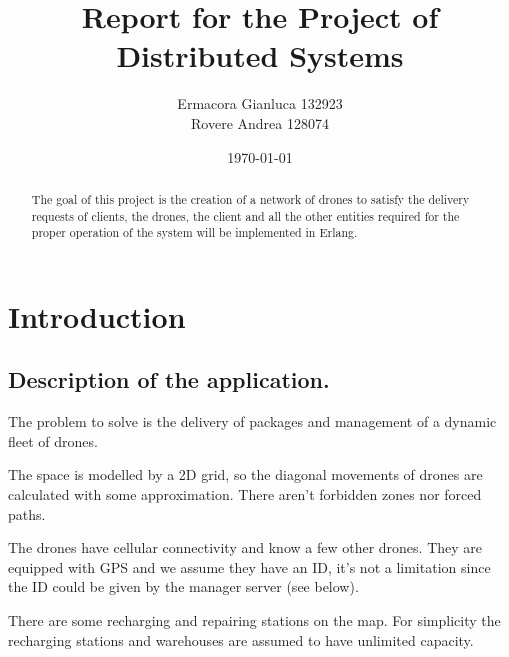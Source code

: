 \documentclass[a4paper, oneside]{memoir}
\title{Report for the Project of Distributed Systems}
\author{Ermacora Gianluca 132923\\ Rovere Andrea 128074}
\date{\today}
\begin{document}
\begin{titlingpage}
\maketitle
\begin{abstract}
The goal of this project is the creation of a network of drones to satisfy the delivery requests of clients, the drones, the client and all the other entities required for the proper operation of the system will be implemented in Erlang.
\end{abstract}
\end{titlingpage}

\chapter{Introduction}\label{ch:intro}


\section{Description of the application.}
The problem to solve is the delivery of packages and management of a dynamic fleet of drones.

The space is modelled by a 2D grid, so the diagonal movements of drones are calculated with some approximation. There aren't forbidden zones nor forced paths.

The drones have cellular connectivity and know a few other drones. They are equipped with GPS and we assume they have an ID, it's not a limitation since the ID could be given by the manager server (see below).

There are some recharging and repairing stations on the map. For simplicity the recharging stations and warehouses are assumed to have unlimited capacity.
\end{document}
